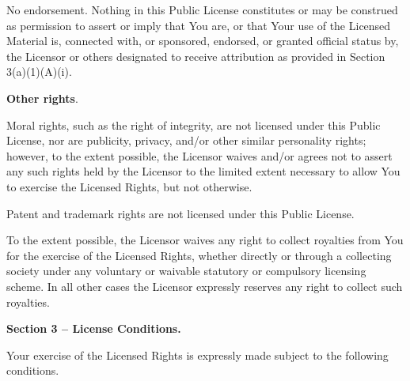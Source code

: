 \begin{ccEnumerate}
\begin{ccEnumerate}
		      	\item No endorsement. Nothing in this Public License constitutes or may be construed as permission to assert 
				or imply that You are, or that Your use of the Licensed Material is, connected with, or sponsored, 
				      endorsed, or granted official status by, the Licensor or others designated to receive attribution 
				      as provided in Section 3(a)(1)(A)(i).
		      \end{ccEnumerate}
		\item \par \textbf{Other rights}.
		      \begin{ccEnumerate}
		      	\item Moral rights, such as the right of integrity, are not licensed under this Public License, nor are publicity,
				privacy, and/or other similar personality rights; however, to the extent possible, the Licensor waives 
				      and/or agrees not to assert any such rights held by the Licensor to the limited extent necessary 
				      to allow You to exercise the Licensed Rights, but not otherwise.
		      	\item Patent and trademark rights are not licensed under this Public License.
		      	\item To the extent possible, the Licensor waives any right to collect royalties from You for the exercise of 
				the Licensed Rights, whether directly or through a collecting society under any voluntary or waivable 
				      statutory or compulsory licensing scheme. In all other cases the Licensor expressly reserves any 
				      right to collect such royalties.
		      \end{ccEnumerate}
		      
	\end{ccEnumerate}
	\par \textbf{Section 3 – License Conditions.}
	\par Your exercise of the Licensed Rights is expressly made subject to the following conditions.
